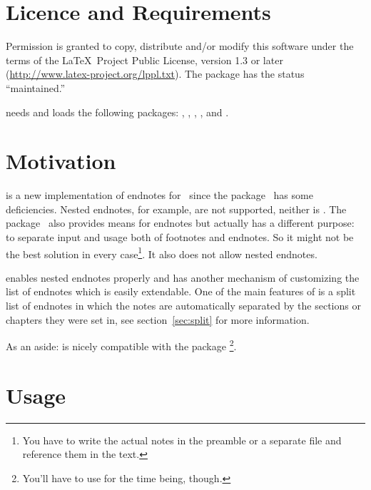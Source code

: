 \documentclass[toc=bib,toc=index]{cnpkgdoc}
\begin{document}
\section{Licence and Requirements}
Permission is granted to copy, distribute and/or modify this software under the
terms of the \LaTeX\ Project Public License, version 1.3 or later
(\url{http://www.latex-project.org/lppl.txt}). The package has the status
``maintained.''

\enotez needs and loads the following packages: , ,
, ,  and .

\section{Motivation}
\enotez is a new implementation of endnotes for \LaTeXe\ since the 
package~\cite{endnotes} has some deficiencies. Nested endnotes, for example, are
not supported, neither is . The  package~\cite{sepfootnotes}
also provides means for endnotes but actually has a different purpose: to
separate input and usage both of footnotes and endnotes. So it might not be the
best solution in every case\footnote{You have to write the actual notes in the
preamble or a separate file and reference them in the text.}. It also does not
allow nested endnotes.

\enotez enables nested endnotes properly and has another mechanism of customizing
the list of endnotes which is easily extendable. One of the main features  of
\enotez is a split list of endnotes in which the notes are automatically
separated by the sections or chapters they were set in, see section~\ref{sec:split}
for more information.

As an aside: \enotez is nicely compatible with the  package%
\footnote{You'll have to use  for the time being, though.}.

\section{Usage}
\end{document}
